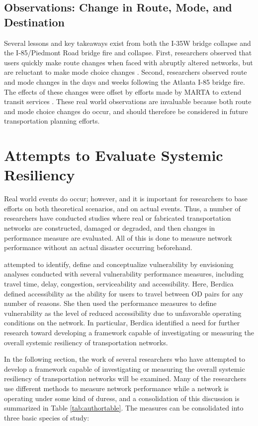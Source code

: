 \subsection{Observations: Change in Route, Mode, and Destination}
Several lessons and key takeaways exist from both the I-35W bridge collapse and the
I-85/Piedmont Road bridge fire and collapse. First, researchers observed that users
quickly make route changes when faced with abruptly altered networks, but are reluctant
to make mode choice changes \citep{levinson2010}. Second, researchers observed
route and mode changes in the days and weeks following the Atlanta I-85 bridge fire.
The effects of these changes were offset by efforts made by MARTA to extend transit
services \citep{hamedi2018, marta2017, marta2018}. These real world observations
are invaluable because both route and mode choice changes do occur, and should therefore
be considered in future transportation planning efforts.

\section{Attempts to Evaluate Systemic Resiliency}

Real world events do occur; however, and it is important for researchers to
base efforts on both theoretical scenarios, and on actual events.
Thus, a number of researchers have conducted studies where real
or fabricated transportation networks are constructed, damaged or degraded, and
then changes in performance measure are evaluated. All of this is done to measure
network performance without
an actual disaster occurring beforehand.

\citet{berdica2002}
attempted
to identify, define and conceptualize vulnerability by envisioning
analyses conducted with
several vulnerability performance measures, including travel time, delay,
congestion,
serviceability and accessibility. Here, Berdica defined accessibility as
the ability for users to
travel between OD pairs for any number of reasons. She
then used the performance
measures to define vulnerability as the level of reduced accessibility due
to unfavorable
operating conditions on the network. In particular, Berdica identified a
need for further
research toward developing a framework capable of investigating or measuring
the overall systemic resiliency of transportation
networks.

In the following section, the work of several researchers who have attempted to develop
a framework capable of investigating or measuring the overall systemic resiliency
of transportation networks will be examined. Many of the researchers use different
methods to measure network performance while a network is operating under some kind of duress,
and a consolidation of this
discussion is summarized
in Table \ref{tab:authortable}. The measures can be consolidated into three
basic species of study:

